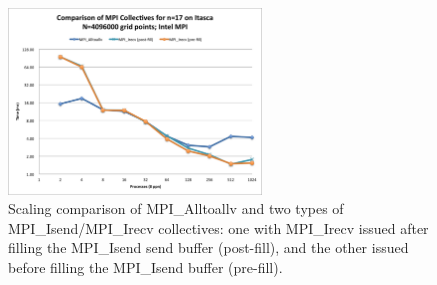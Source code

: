 \documentclass{report}
\begin{document}
\begin{figure}
\centering
\includegraphics[width=0.6\textwidth]{performance_content/scaling/strong_scaling_4M_regular_n17comparison_commOnly.png}
\caption{Scaling comparison of MPI\_Alltoallv and two types of MPI\_Isend/MPI\_Irecv collectives: one with MPI\_Irecv issued after filling the MPI\_Isend send buffer (post-fill), and the other issued before filling the MPI\_Isend buffer (pre-fill).}
\end{figure}
\end{document}
